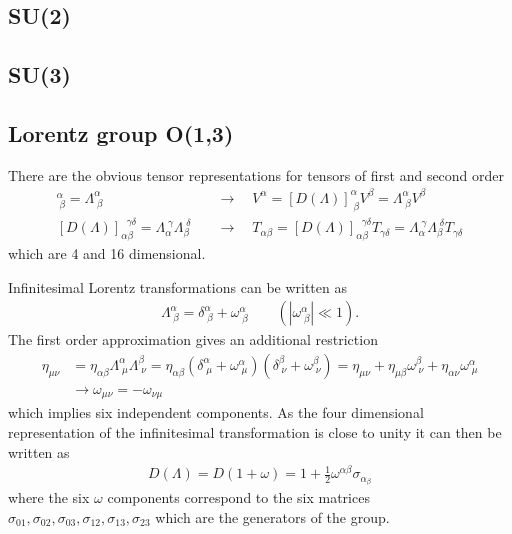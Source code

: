 \documentclass[10pt,a4paper]{book}
\theoremstyle{definition}
\begin{document}
\subsection{SU(2)}
\subsection{SU(3)}

\subsection{Lorentz group O(1,3)}
There are the obvious tensor representations for tensors of first and second order
\begin{align}
    [D(\Lambda)]^\alpha_{\;\beta}=\Lambda^\alpha_{\;\beta}\quad &\rightarrow\quad V^\alpha = [D(\Lambda)]^\alpha_{\;\beta} V^\beta=\Lambda^\alpha_{\;\beta} V^\beta\\
    [D(\Lambda)]_{\alpha\beta}^{\;\;\gamma\delta}=\Lambda_\alpha^{\;\gamma}\Lambda_\beta^{\;\delta}\quad&\rightarrow\quad T_{\alpha\beta} = [D(\Lambda)]_{\alpha\beta}^{\;\;\gamma\delta} T_{\gamma\delta}=\Lambda_\alpha^{\;\gamma}\Lambda_\beta^{\;\delta}T_{\gamma\delta}
\end{align}
which are 4 and 16 dimensional.

Infinitesimal Lorentz transformations can be written as
\begin{align}
    \Lambda^\alpha_{\;\beta}=\delta^\alpha_{\;\beta}+\omega^\alpha_{\;\beta}\qquad(|\omega^\alpha_{\;\beta}|\ll 1).
\end{align}
The first order approximation gives an additional restriction
\begin{align}
    \eta_{\mu\nu} &= \eta_{\alpha\beta}\Lambda^\alpha_{\;\mu}\Lambda^\beta_{\;\nu}=\eta_{\alpha\beta}(\delta^\alpha_{\;\mu}+\omega^\alpha_{\;\mu})(\delta^\beta_{\;\nu}+\omega^\beta_{\;\nu})=\eta_{\mu\nu}+\eta_{\mu\beta}\omega^\beta_{\;\nu}+\eta_{\alpha\nu}\omega^\alpha_{\;\mu}\\
    &\rightarrow \omega_{\mu\nu}=-\omega_{\nu\mu}
\end{align}
which implies six independent components. As the four dimensional representation of the infinitesimal transformation is close to unity it can then be written as
\begin{align}
    D(\Lambda)=D(1+\omega)=1+\frac{1}{2}\omega^{\alpha\beta}\sigma_{\alpha_\beta}
\end{align}
where the six $\omega$ components correspond to the six matrices $\sigma_{01},\sigma_{02},\sigma_{03},\sigma_{12},\sigma_{13},\sigma_{23}$ which are the generators of the group.
\end{document}
